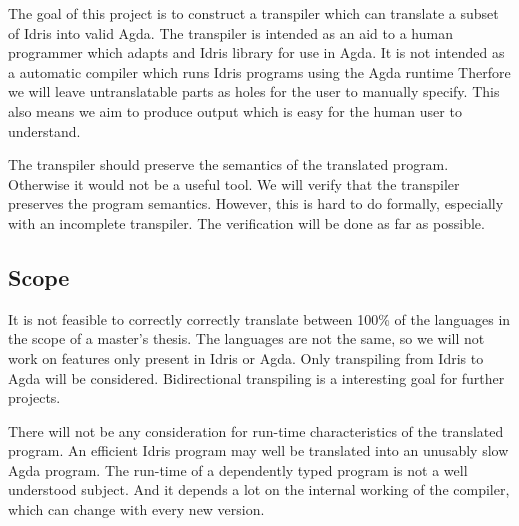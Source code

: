 \documentclass[parskip=half]{scrartcl}
\begin{document}
The goal of this project is to construct a transpiler which can translate
a subset of Idris into valid Agda. The transpiler is intended as an aid to
a human programmer which adapts and Idris library for use in Agda.  It is not
intended as a automatic compiler which runs Idris programs using the Agda
runtime Therfore we will leave untranslatable parts as holes for the user to
manually specify. This also means we aim to produce output which is easy for
the human user to understand.



The transpiler should preserve the semantics of the translated program.
Otherwise it would not be a useful tool.  We will verify that the transpiler
preserves the program semantics.  However, this is hard to do formally,
especially with an incomplete transpiler.  The verification will be done as far
as possible.


\subsection{Scope}

It is not feasible to correctly correctly translate between 100\% of the
languages in the scope of a master's thesis.  The languages are not the same,
so we will not work on features only present in Idris or Agda.  Only
transpiling from Idris to Agda will be considered. Bidirectional transpiling is
a interesting goal for further projects.

There will not be any consideration for run-time characteristics of the
translated program. An efficient Idris program may well be translated into an
unusably slow Agda program. The run-time of a dependently typed program is not
a well understood subject. And it depends a lot on the internal working of the
compiler, which can change with every new version.
\end{document}

